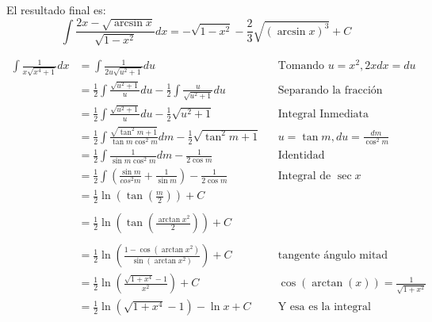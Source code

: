 \documentclass[14pt]{extarticle}
\begin{document}
El resultado final es: $$\int\dfrac{2x-\sqrt{\arcsin x}}{\sqrt{1-x^2}}dx = -\sqrt{1-x^2}- \frac{2}{3}\sqrt{(\arcsin x)^3} + C $$



\begin{align}
      \int \frac{1}{x\sqrt{x^4+1}}dx
       & =  \int \frac{1}{2u\sqrt{u^2+1}}du                                                               &  & \text{Tomando $u = x^2,  2xdx = du$}           \\
       & = \frac{1}{2} \int \frac{\sqrt{u^2+1}}{u}du -  \frac{1}{2} \int  \frac{u}{\sqrt{u^2+1}}du        &  & \text{Separando la fracción}                   \\
       & = \frac{1}{2} \int \frac{\sqrt{u^2+1}}{u}du - \frac{1}{2}\sqrt{u^2+1}                            &  & \text{Integral Inmediata}                      \\
       & = \frac{1}{2} \int \frac{\sqrt{\tan^2 m +1}}{\tan{m}  \cos^2 m}dm - \frac{1}{2}\sqrt{\tan^2 m+1} &  & \text{$u = \tan m, du = \frac{dm}{\cos^2 m} $} \\
       & = \frac{1}{2} \int \frac{1}{\sin m \cos^2m}dm - \frac{1}{2\cos m}                                &  & \text{Identidad}                               \\
       & = \frac{1}{2} \int \left( \frac{\sin m}{cos^2 m} + \frac{1}{\sin m} \right) - \frac{1}{2\cos m}  &  & \text{Integral de $\sec{x}$}                   \\
       & = \frac{1}{2}\ln{\left( \tan({\frac{m}{2}}) \right)}+C                                                                                               \\                                                                                        \\
       & = \frac{1}{2}\ln{\left( \tan({\frac{\arctan{x^2}}{2}}) \right)}+C          \\                                                                          \\
       & = \frac{1}{2}\ln{\left( \frac{1-\cos(\arctan x^2)}{\sin(\arctan x^2)}      \right)} + C  && \text{tangente ángulo mitad} \\ 
       & = \frac{1}{2}\ln{\left( \frac{\sqrt{1+x^4}-1}{x^2} \right)} + C && \text{$\cos(\arctan(x)) = \frac{1}{\sqrt{1+x^2}}$ } \\
       & = \frac{1}{2}\ln{(\sqrt{1+x^4}-1)} - \ln{x} + C && \text{Y esa es la integral}
\end{align}
\end{document}
